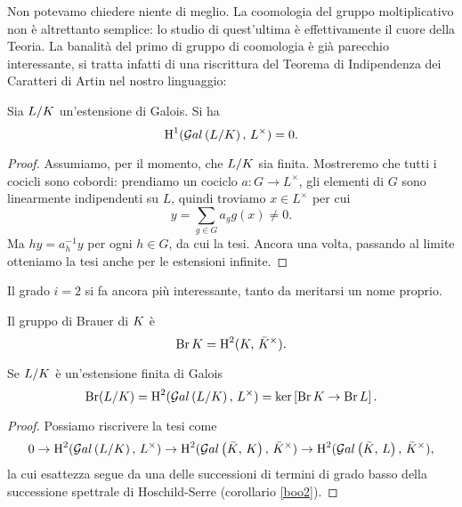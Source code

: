 Non potevamo chiedere niente di meglio. La coomologia del gruppo moltiplicativo non è altrettanto semplice: lo studio di quest'ultima è effettivamente il cuore della Teoria. La banalità del primo di gruppo di coomologia è già parecchio interessante, si tratta infatti di una riscrittura del Teorema di Indipendenza dei Caratteri di Artin nel nostro linguaggio:

\begin{theorem}[Hilbert 90]\label{H90}
	Sia $ L/K $ un'estensione di Galois. Si ha
	\[ \operatorname{H}^1(\mathcal{G}al\left(  L / K \right), \, L^\times) = 0. \]
\end{theorem}
\begin{proof}
	Assumiamo, per il momento, che $ L/K $ sia finita. Mostreremo che tutti i cocicli sono cobordi: prendiamo un cociclo $ a \colon G \to L^\times $, gli elementi di $ G $ sono linearmente indipendenti su $ L $, quindi troviamo $ x \in L^\times $ per cui
	\[ y = \sum_{g \in G} a_g g(x) \neq 0. \]
	Ma $ hy = a_h^{-1}y $ per ogni $ h \in G $, da cui la tesi.
	Ancora una volta, passando al limite otteniamo la tesi anche per le estensioni infinite. \todo[bruttino]
\end{proof}

Il grado $ i = 2 $ si fa ancora più interessante, tanto da meritarsi un nome proprio.
\begin{definition}
	Il gruppo di Brauer di $ K $ è $$  \operatorname{Br} K = \operatorname{H}^2(K, \, \bar{K}^\times).  $$
\end{definition}




\begin{lemma}\label{stronzetto}
	Se $ L/K $ è un'estensione finita di Galois
	\[ \operatorname{Br}(L/K) = \operatorname{H}^2(\mathcal{G}al\left( L/K \right), \, L^\times) = \ker  \left[\operatorname{Br} K \to \operatorname{Br} L\right].  \]
\end{lemma}
\begin{proof}
	Possiamo riscrivere la tesi come
	\[ 0 \to \operatorname{H}^2(\mathcal{G}al\left( L/K \right), \, L^\times) \to \operatorname{H}^2(\mathcal{G}al\left( \bar{K}, \, K \right), \, \bar{K}^\times) \to \operatorname{H}^2(\mathcal{G}al\left( \bar{K}, \, L \right), \, \bar{K}^\times), \]
	la cui esattezza segue da una delle successioni di termini di grado basso della successione spettrale di Hoschild-Serre (corollario \ref{boo2}).
\end{proof}

